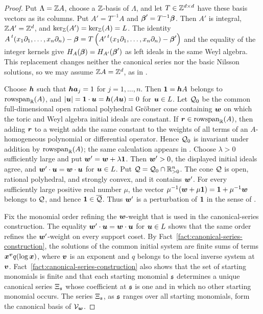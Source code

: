 \begin{proof}
	Put \(\Lambda=\mathbb Z A\), choose a \(\mathbb Z\)-basis of \(\Lambda\), and let \(T\in\mathbb Z^{d\times d}\) have these basis vectors as its columns.
	Put \(A'=T^{-1}A\) and \(\boldsymbol{\beta}'=T^{-1}\boldsymbol{\beta}\).
	Then \(A'\) is integral, \(\mathbb Z A'=\mathbb Z^d\), and \(\ker_{\mathbb Z}(A')=\ker_{\mathbb Z}(A)=L\).
	The identity \(A\prescript{t}{}{(x_1\partial_1,\ldots,x_n\partial_n)}-\boldsymbol{\beta} = T\left( A'\prescript{t}{}{(x_1\partial_1,\ldots,x_n\partial_n)}-\boldsymbol{\beta}' \right)\) and the equality of the integer kernels give \(H_A(\boldsymbol{\beta})=H_{A'}(\boldsymbol{\beta}')\) as left ideals in the same Weyl algebra.
	This replacement changes neither the canonical series nor the basic Nilsson solutions, so we may assume \(\mathbb Z A=\mathbb Z^d\), as in \cite{DMM12}.

	Choose \(\boldsymbol{h}\) such that \(\boldsymbol{h}\boldsymbol{a}_j=1\) for \(j=1,\ldots,n\).
	Then \(\boldsymbol{1}=\boldsymbol{h} A\) belongs to \(\operatorname{rowspan}_{\mathbb R}(A)\), and \(|\boldsymbol{u}| = \boldsymbol{1}\cdot\boldsymbol{u} = \boldsymbol{h}(A\boldsymbol{u}) = 0\) for \(\boldsymbol{u}\in L\).
	Let \(\mathcal Q_0\) be the common full-dimensional open rational polyhedral Gr\"obner cone containing \(\boldsymbol{w}\) on which the toric and Weyl algebra initial ideals are constant.
	If \(\boldsymbol{r}\in\operatorname{rowspan}_{\mathbb R}(A)\), then adding \(\boldsymbol{r}\) to a weight adds the same constant to the weights of all terms of an \(A\)-homogeneous polynomial or differential operator.
	Hence \(\mathcal Q_0\) is invariant under addition by \(\operatorname{rowspan}_{\mathbb R}(A)\); the same calculation appears in \cite[Remark~2.5]{DMM12}.
	Choose \(\lambda>0\) sufficiently large and put \(\boldsymbol{w}'=\boldsymbol{w}+\lambda\boldsymbol{1}\).
	Then \(\boldsymbol{w}'>0\), the displayed initial ideals agree, and \(\boldsymbol{w}'\cdot\boldsymbol{u}=\boldsymbol{w}\cdot\boldsymbol{u}\) for \(\boldsymbol{u}\in L\).
	Put \(\mathcal Q=\mathcal Q_0\cap\mathbb R_{>0}^n\).
	The cone \(\mathcal Q\) is open, rational polyhedral, and strongly convex, and it contains \(\boldsymbol{w}'\).
	For every sufficiently large positive real number \(\mu\), the vector \(\mu^{-1}(\boldsymbol{w}+\mu\boldsymbol{1})=\boldsymbol{1}+\mu^{-1}\boldsymbol{w}\) belongs to \(\mathcal Q\), and hence \(\boldsymbol{1}\in\overline{\mathcal Q}\).
	Thus \(\boldsymbol{w}'\) is a perturbation of \(\boldsymbol{1}\) in the sense of \cite[Definition~3.3]{DMM12}.

	Fix the monomial order refining the \(\boldsymbol{w}\)-weight that is used in the canonical-series construction.
	The equality \(\boldsymbol{w}'\cdot\boldsymbol{u}=\boldsymbol{w}\cdot\boldsymbol{u}\) for \(\boldsymbol{u}\in L\) shows that the same order refines the \(\boldsymbol{w}'\)-weight on every support coset.
	By Fact~\ref{fact:canonical-series-construction}, the solutions of the common initial system are finite sums of terms \(\boldsymbol{x}^{\boldsymbol{v}}q(\log\boldsymbol{x})\), where \(\boldsymbol{v}\) is an exponent and \(q\) belongs to the local inverse system at \(\boldsymbol{v}\).
	Fact~\ref{fact:canonical-series-construction} also shows that the set of starting monomials is finite and that each starting monomial \(\mathfrak s\) determines a unique canonical series \(\Xi_{\mathfrak s}\) whose coefficient at \(\mathfrak s\) is one and in which no other starting monomial occurs.
	The series \(\Xi_{\mathfrak s}\), as \(\mathfrak s\) ranges over all starting monomials, form the canonical basis of \(\mathcal V_{\boldsymbol{w}}\).


\end{proof}
